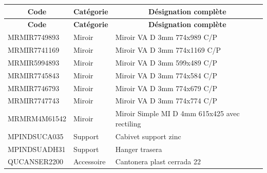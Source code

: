 \documentclass[12pt,a4paper]{article}
\begin{document}
\begin{longtable}{|p{3cm}|p{3cm}|p{8cm}|}
\hline
\multicolumn{1}{|c|}{\textbf{Code}} & \multicolumn{1}{c|}{\textbf{Catégorie}} & \multicolumn{1}{c|}{\textbf{Désignation complète}} \\
\hline
\endfirsthead
\hline
\multicolumn{1}{|c|}{\textbf{Code}} & \multicolumn{1}{c|}{\textbf{Catégorie}} & \multicolumn{1}{c|}{\textbf{Désignation complète}} \\
\hline
\endhead
\hline
\endfoot
MRMIR7749893 & Miroir & Miroir VA D 3mm 774x989 C/P \\
MRMIR7741169 & Miroir & Miroir VA D 3mm 774x1169 C/P \\
MRMIR5994893 & Miroir & Miroir VA D 3mm 599x489 C/P \\
MRMIR7745843 & Miroir & Miroir VA D 3mm 774x584 C/P \\
MRMIR7746793 & Miroir & Miroir VA D 3mm 774x679 C/P \\
MRMIR7747743 & Miroir & Miroir VA D 3mm 774x774 C/P \\
MRMRM4M61542 & Miroir & Miroir Simple MI D 4mm 615x425 avec rectiling \\
MPINDSUCA035 & Support & Cabivet support zinc \\
MPINDSUADH31 & Support & Hanger trasera \\
QUCANSER2200 & Accessoire & Cantonera plast cerrada 22 \\
\hline
\end{longtable}
\end{document}
